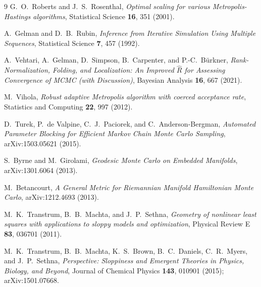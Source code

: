\documentclass[11pt]{article}
\begin{document}
\begin{thebibliography}{9}
G.~O.~Roberts and J.~S.~Rosenthal,
\textit{Optimal scaling for various Metropolis-Hastings algorithms},
Statistical Science \textbf{16}, 351 (2001).

A.~Gelman and D.~B.~Rubin,
\textit{Inference from Iterative Simulation Using Multiple Sequences},
Statistical Science \textbf{7}, 457 (1992).

A.~Vehtari, A.~Gelman, D.~Simpson, B.~Carpenter, and P.-C.~B\"urkner,
\textit{Rank-Normalization, Folding, and Localization: An Improved $\widehat{R}$ for
Assessing Convergence of MCMC (with Discussion)},
Bayesian Analysis \textbf{16}, 667 (2021).

M.~Vihola,
\textit{Robust adaptive Metropolis algorithm with coerced acceptance rate},
Statistics and Computing \textbf{22}, 997 (2012).

D.~Turek, P.~de Valpine, C.~J.~Paciorek, and C.~Anderson-Bergman,
\textit{Automated Parameter Blocking for Efficient Markov Chain Monte Carlo Sampling},
arXiv:1503.05621 (2015).

S.~Byrne and M.~Girolami,
\textit{Geodesic Monte Carlo on Embedded Manifolds},
arXiv:1301.6064 (2013).

M.~Betancourt,
\textit{A General Metric for Riemannian Manifold Hamiltonian Monte Carlo},
arXiv:1212.4693 (2013).

M.~K.~Transtrum, B.~B.~Machta, and J.~P.~Sethna,
\textit{Geometry of nonlinear least squares with applications to sloppy models and
optimization},
Physical Review E \textbf{83}, 036701 (2011).

M.~K.~Transtrum, B.~B.~Machta, K.~S.~Brown, B.~C.~Daniels, C.~R.~Myers, and J.~P.~Sethna,
\textit{Perspective: Sloppiness and Emergent Theories in Physics, Biology, and Beyond},
Journal of Chemical Physics \textbf{143}, 010901 (2015); arXiv:1501.07668.

\end{thebibliography}
\end{document}
